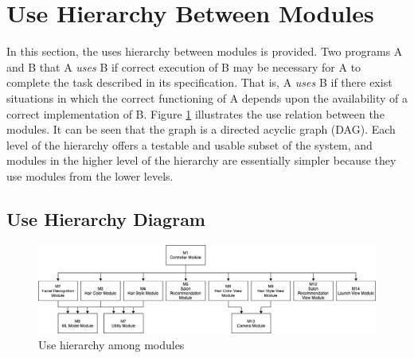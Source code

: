 \documentclass[12pt, titlepage]{article}
\begin{document}
\section{Use Hierarchy Between Modules} \label{SecUse}

In this section, the uses hierarchy between modules is
provided. Two programs A and B that A {\em uses} B if
correct execution of B may be necessary for A to complete the task described in
its specification. That is, A {\em uses} B if there exist situations in which
the correct functioning of A depends upon the availability of a correct
implementation of B.  Figure \ref{FigUH} illustrates the use relation between
the modules. It can be seen that the graph is a directed acyclic graph
(DAG). Each level of the hierarchy offers a testable and usable subset of the
system, and modules in the higher level of the hierarchy are essentially simpler
because they use modules from the lower levels.



\subsection{Use Hierarchy Diagram}
\begin{center}
\begin{figure}[H]
\includegraphics[width=1\textwidth]{Design/SoftArchitecture/use_hierarchy.jpg}
\caption{Use hierarchy among modules}
\label{FigUH} 
\end{figure}
\end{center}
\end{document}
